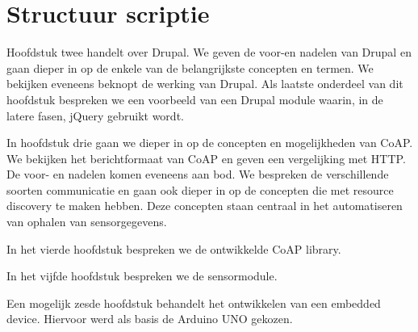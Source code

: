 \section{Structuur scriptie}

Hoofdstuk twee handelt over Drupal. We geven de voor-en nadelen van Drupal en gaan dieper in op de enkele van de belangrijkste concepten en termen. We bekijken eveneens beknopt de werking van Drupal. Als laatste onderdeel van dit hoofdstuk bespreken we een voorbeeld van een Drupal module waarin, in de latere fasen, jQuery gebruikt wordt. %

In hoofdstuk drie gaan we dieper in op de concepten en mogelijkheden van CoAP. We bekijken het berichtformaat van CoAP en geven een vergelijking met HTTP. De voor- en nadelen komen eveneens aan bod. We bespreken de verschillende soorten communicatie en gaan ook dieper in op de concepten die met resource discovery te maken hebben. Deze concepten staan centraal in het automatiseren van ophalen van sensorgegevens. %

In het vierde hoofdstuk bespreken we de ontwikkelde CoAP library. %

In het vijfde hoofdstuk bespreken we de sensormodule. %

Een mogelijk zesde hoofdstuk behandelt het ontwikkelen van een embedded device. Hiervoor werd als basis de Arduino UNO gekozen.










